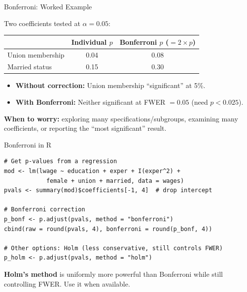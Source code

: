 \documentclass[handout, aspectratio=169]{beamer}
\numberwithin{equation}{section}
\begin{document}
\begin{frame}{Bonferroni: Worked Example}

Two coefficients tested at $\alpha = 0.05$:

\smallskip
\begin{center}
\renewcommand{\arraystretch}{1.2}
\begin{tabular}{lcc}
\toprule
& Individual $p$ & Bonferroni $p$ ($= 2 \times p$) \\
\midrule
Union membership & 0.04 & 0.08 \\
Married status & 0.15 & 0.30 \\
\bottomrule
\end{tabular}
\end{center}

\pause
\smallskip

\begin{itemize}
\item \textbf{Without correction:} Union membership ``significant'' at 5\%.
\item \textbf{With Bonferroni:} Neither significant at FWER $= 0.05$ (need $p < 0.025$).
\end{itemize}

\pause
\smallskip

\textbf{When to worry:} exploring many specifications/subgroups, examining many coefficients, or reporting the ``most significant'' result.
\end{frame}

\begin{frame}[fragile]{Bonferroni in R}
\begin{lstlisting}
# Get p-values from a regression
mod <- lm(lwage ~ education + exper + I(exper^2) +
            female + union + married, data = wages)
pvals <- summary(mod)$coefficients[-1, 4]  # drop intercept

# Bonferroni correction
p_bonf <- p.adjust(pvals, method = "bonferroni")
cbind(raw = round(pvals, 4), bonferroni = round(p_bonf, 4))

# Other options: Holm (less conservative, still controls FWER)
p_holm <- p.adjust(pvals, method = "holm")
\end{lstlisting}

\pause
\smallskip
\textbf{Holm's method} is uniformly more powerful than Bonferroni while still controlling FWER.  Use it when available.
\end{frame}
\end{document}
